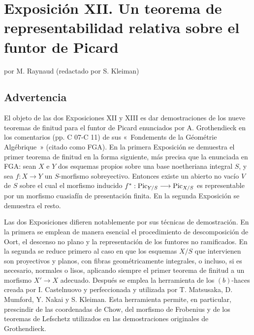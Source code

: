 
\section*{Exposición XII. Un teorema de representabilidad relativa sobre el funtor de Picard}
\begin{center}
por M. Raynaud (redactado por S. Kleiman)
\end{center}

\subsection*{Advertencia}

El objeto de las dos Exposiciones XII y XIII es dar demostraciones de los
nueve teoremas de finitud para el funtor de Picard enunciados por A.
Grothendieck en los comentarios (pp. C 07-C 11) de sus
«~Fondements de la Géométrie Algébrique~» (citado como FGA). En la primera
Exposición se demuestra el primer teorema de finitud en la forma siguiente,
más precisa que la enunciada en FGA: sean \(X\) e \(Y\) dos esquemas propios
sobre una base noetheriana integral \(S\), y sea
\(f:X\longrightarrow Y\) un \(S\)-morfismo sobreyectivo. Entonces existe un
abierto no vacío \(V\) de \(S\) sobre el cual el morfismo inducido
\(f^*:\operatorname{Pic}_{Y/S}\longrightarrow \operatorname{Pic}_{X/S}\) es representable por un
morfismo cuasiafín de presentación finita. En la segunda Exposición se
demuestra el resto.

Las dos Exposiciones difieren notablemente por sus técnicas de demostración.
En la primera se emplean de manera esencial el procedimiento de
descomposición de Oort, el descenso no plano y la representación de los
funtores no ramificados. En la segunda se reduce primero al caso en que los
esquemas \(X/S\) que intervienen son proyectivos y planos, con fibras
geométricamente integrales, o incluso, si es necesario, normales o lisos,
aplicando siempre el primer teorema de finitud a un morfismo
\(X'\to X\) adecuado. Después se emplea la herramienta de los
\((b)\)-haces creada por I. Castelnuovo y perfeccionada y utilizada por T.
Matsusaka, D. Mumford, Y. Nakai y S. Kleiman. Esta herramienta permite, en
particular, prescindir de las coordenadas de Chow, del morfismo de Frobenius
y de los teoremas de Lefschetz utilizados en las demostraciones originales
de Grothendieck.

